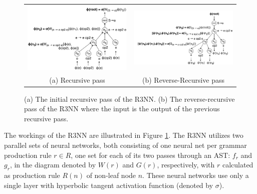 \documentclass{article}
\begin{document}
\begin{figure}[h]
    \begin{tabular}{cc}
        \begin{minipage}{0.45\linewidth}
            \includegraphics[scale=0.16]{figures/tree2.png}
        \end{minipage}
        &
        \begin{minipage}{0.55\linewidth}
            \includegraphics[scale=0.16]{figures/tree3.png}
        \end{minipage}
        \\
        (a) Recursive pass & (b) Reverse-Recursive pass
    \end{tabular}
    \caption{(a) The initial recursive pass of the R3NN. (b) The reverse-recursive pass of the R3NN where the input is the output of the previous recursive pass.}
    \label{r3nn}
\end{figure}

The workings of the R3NN are illustrated in Figure \ref{r3nn}.
The R3NN utilizes two parallel sets of neural networks,
both consisting of one neural net per grammar production rule $r \in R$,
one set for each of its two passes through an AST: $f_r$ and $g_r$,
in the diagram denoted by $W(r)$ and $G(r)$, respectively,
with $r$ calculated as production rule $R(n)$ of non-leaf node $n$.
These neural networks use only a single layer with hyperbolic tangent activation function (denoted by $\sigma$).
\end{document}
